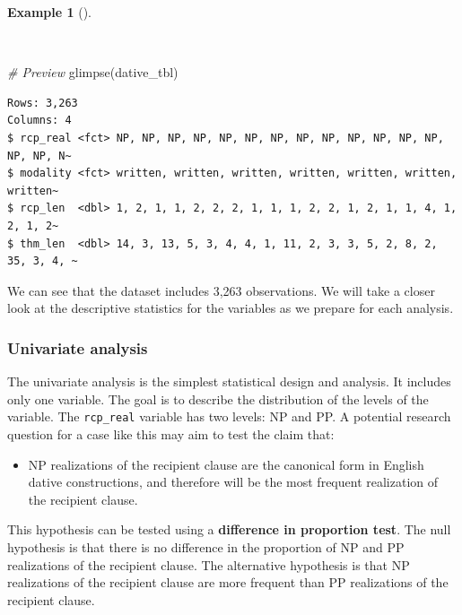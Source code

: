\documentclass[
  letterpaper,
  krantz1]{latex/krantz-mod}
\newenvironment{Shaded}{\begin{snugshade}}{\end{snugshade}}
\newcommand{\CommentTok}[1]{\textcolor[rgb]{0.00,0.00,0.00}{\textit{#1}}}
\newcommand{\FunctionTok}[1]{\textcolor[rgb]{0.00,0.00,0.00}{#1}}
\newcommand{\NormalTok}[1]{\textcolor[rgb]{0.00,0.00,0.00}{#1}}
\providecommand{\tightlist}{%
  \setlength{\itemsep}{0pt}\setlength{\parskip}{0pt}}\usepackage{longtable,booktabs,array}
\theoremstyle{definition}
\theoremstyle{definition}
\newtheorem{example}{Example}[chapter]
\theoremstyle{remark}
\begin{document}
\begin{example}[]\protect\hypertarget{exm-infer-cat-dative-preview}{}\label{exm-infer-cat-dative-preview}

~

\begin{Shaded}
\begin{Highlighting}[numbers=left,,]
\CommentTok{\# Preview }
\FunctionTok{glimpse}\NormalTok{(dative\_tbl)}
\end{Highlighting}
\end{Shaded}

\begin{verbatim}
Rows: 3,263
Columns: 4
$ rcp_real <fct> NP, NP, NP, NP, NP, NP, NP, NP, NP, NP, NP, NP, NP, NP, NP, N~
$ modality <fct> written, written, written, written, written, written, written~
$ rcp_len  <dbl> 1, 2, 1, 1, 2, 2, 2, 1, 1, 1, 2, 2, 1, 2, 1, 1, 4, 1, 2, 1, 2~
$ thm_len  <dbl> 14, 3, 13, 5, 3, 4, 4, 1, 11, 2, 3, 3, 5, 2, 8, 2, 35, 3, 4, ~
\end{verbatim}

\end{example}

We can see that the dataset includes 3,263 observations. We will take a
closer look at the descriptive statistics for the variables as we
prepare for each analysis.

\subsubsection{Univariate analysis}\label{sec-infer-cat-univariate}

The univariate analysis is the simplest statistical design and analysis.
It includes only one variable. The goal is to describe the distribution
of the levels of the variable. The \texttt{rcp\_real} variable has two
levels: NP and PP. A potential research
question for a case like this may aim to test
the claim that:

\begin{itemize}
\tightlist
\item
  NP realizations of the recipient clause are the canonical form in
  English dative constructions, and therefore will be the most frequent
  realization of the recipient clause.
\end{itemize}

This hypothesis can be tested using a \textbf{difference in proportion
test}. The null
hypothesis is that there is no difference in the
proportion of NP and PP realizations of the recipient clause. The
alternative hypothesis is that NP
realizations of the recipient clause are more frequent than PP
realizations of the recipient clause.
\end{document}
